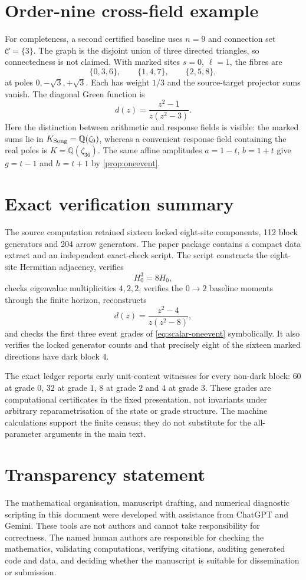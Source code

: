 \documentclass[11pt]{article}
\theoremstyle{definition}
\theoremstyle{remark}
\begin{document}
\section{Order-nine cross-field example}\label{app:n9}

For completeness, a second certified baseline uses $n=9$ and connection set $\mathcal C=\{3\}$. The graph is the disjoint union of three directed triangles, so connectedness is not claimed. With marked sites $s=0$, $\ell=1$, the fibres are
\[
\{0,3,6\},\qquad \{1,4,7\},\qquad \{2,5,8\},
\]
at poles $0,-\sqrt3,+\sqrt3$. Each has weight $1/3$ and the source-target projector sums vanish. The diagonal Green function is
\[
d(z)=\frac{z^2-1}{z(z^2-3)}.
\]
Here the distinction between arithmetic and response fields is visible: the marked sums lie in $K_{\rm Song}=\mathbb Q(\zeta_9)$, whereas a convenient response field containing the real poles is $K=\mathbb Q(\zeta_{36})$. The same affine amplitudes $a=1-t$, $b=1+t$ give $g=t-1$ and $h=t+1$ by \cref{prop:oneevent}.

\section{Exact verification summary}\label{app:verification}

The source computation retained sixteen locked eight-site components, 112 block generators and 204 arrow generators. The paper package contains a compact data extract and an independent exact-check script. The script constructs the eight-site Hermitian adjacency, verifies
\[
H_0^3=8H_0,
\]
checks eigenvalue multiplicities $4,2,2$, verifies the $0\to2$ baseline moments through the finite horizon, reconstructs
\[
d(z)=\frac{z^2-4}{z(z^2-8)},
\]
and checks the first three event grades of \eqref{eq:scalar-oneevent} symbolically. It also verifies the locked generator counts and that precisely eight of the sixteen marked directions have dark block $4$.

The exact ledger reports early unit-content witnesses for every non-dark block: $60$ at grade $0$, $32$ at grade $1$, $8$ at grade $2$ and $4$ at grade $3$. These grades are computational certificates in the fixed presentation, not invariants under arbitrary reparametrisation of the state or grade structure. The machine calculations support the finite census; they do not substitute for the all-parameter arguments in the main text.

\section*{Transparency statement}
The mathematical organisation, manuscript drafting, and numerical diagnostic scripting in this document were developed with assistance from ChatGPT and Gemini. These tools are not authors and cannot take responsibility for correctness. The named human authors are responsible for checking the mathematics, validating computations, verifying citations, auditing generated code and data, and deciding whether the manuscript is suitable for dissemination or submission.
\end{document}
